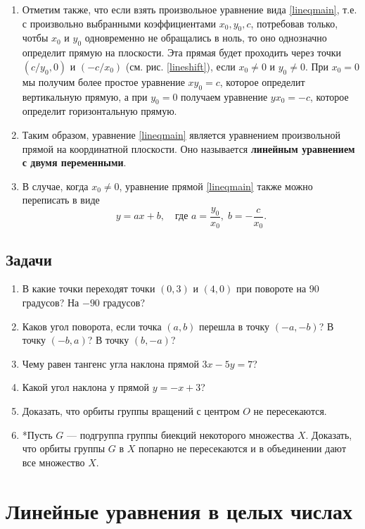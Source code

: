 \begin{enumerate}
\item Отметим также, что если взять произвольное уравнение вида \eqref{lineqmain}, т.е. с произвольно выбранными коэффициентами $x_0,y_0,c$, потребовав только, чотбы $x_0$ и $y_0$ одновременно не обращались в ноль, то оно однозначно определит прямую на плоскости. Эта прямая будет проходить через точки $(c/y_0,0)$ и $(-c/x_0)$ (см. рис. \ref{lineshift}), если $x_0\ne 0$ и $y_0\ne 0$. При $x_0=0$ мы получим более простое уравнение $xy_0=c$, которое определит вертикальную прямую, а при $y_0=0$ получаем уравнение $yx_0=-c$, которое определит горизонтальную прямую.

\item Таким образом, уравнение \eqref{lineqmain} является уравнением произвольной прямой на координатной плоскости. Оно называется \textbf{линейным уравнением с двумя переменными}.
\item В случае, когда $x_0\ne 0$, уравнение прямой \eqref{lineqmain} также можно переписать в виде
$$
y = ax+b,\quad\mbox{где }a=\frac{y_0}{x_0},\; b=-\frac{c}{x_0}.
$$
\end{enumerate}
\subsection*{Задачи}

\begin{enumerate}
\item В какие точки переходят точки $(0,3)$ и $(4,0)$ при повороте на $90$ градусов? На $-90$ градусов?
\item Каков угол поворота, если точка $(a,b)$ перешла в точку $(-a,-b)$? В точку $(-b,a)$? В точку $(b,-a)$?
\item Чему равен тангенс угла наклона прямой $3x-5y=7$?
\item Какой угол наклона у прямой $y=-x+3$?
\item Доказать, что орбиты группы вращений с центром $O$ не пересекаются.
\item *Пусть $G$ --- подгруппа группы биекций некоторого множества $X$. Доказать, что орбиты группы $G$ в $X$ попарно не пересекаются и в объединении дают все множество $X$.
\end{enumerate}


\section{Линейные уравнения в целых числах}


